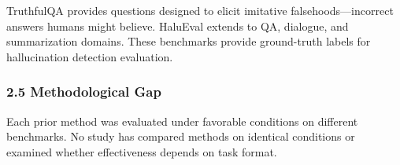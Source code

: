 TruthfulQA \citep{lin2022truthfulqa} provides questions designed to elicit imitative falsehoods---incorrect answers humans might believe. HaluEval \citep{li2023halueval} extends to QA, dialogue, and summarization domains. These benchmarks provide ground-truth labels for hallucination detection evaluation.

\subsubsection{2.5 Methodological Gap}

Each prior method was evaluated under favorable conditions on different benchmarks. No study has compared methods on identical conditions or examined whether effectiveness depends on task format.

